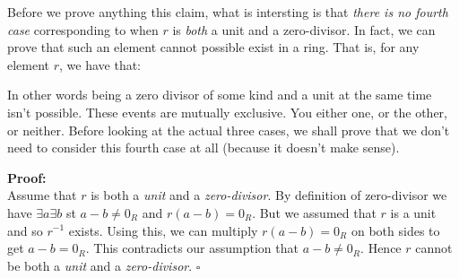 \begin{figure}[h]
\end{figure}

Before we prove anything this claim, what is intersting is that \textit{there is no fourth case} 
corresponding to when $r$ is \textit{both} a unit and a zero-divisor. In fact, we 
can prove that such an element cannot possible exist in a ring. That is, 
for any element $r$, we have that:


In other words being a zero divisor of some kind and a unit at the same time isn't possible. 
These events are mutually exclusive. You either one, or the other, or neither. 
Before looking at the actual three cases, we shall prove that we don't
need to consider this fourth case at all (because it doesn't make sense).

\frmrule

\textbf{Proof:}\\
Assume that $r$ is both a \textit{unit} and a \textit{zero-divisor}. 
By definition of zero-divisor we have $\exists a \exists b$ st $a-b \neq 0_R$ and $r(a-b) = 0_R$. 
But we assumed that $r$ is a unit and so $r^{-1}$ exists. Using this, we can multiply $r(a-b) = 0_R$ on 
both sides to get $a-b = 0_R$. This contradicts our assumption that $a-b \neq 0_R$. 
Hence $r$ cannot be both a \textit{unit} and a \textit{zero-divisor}. $\square$

